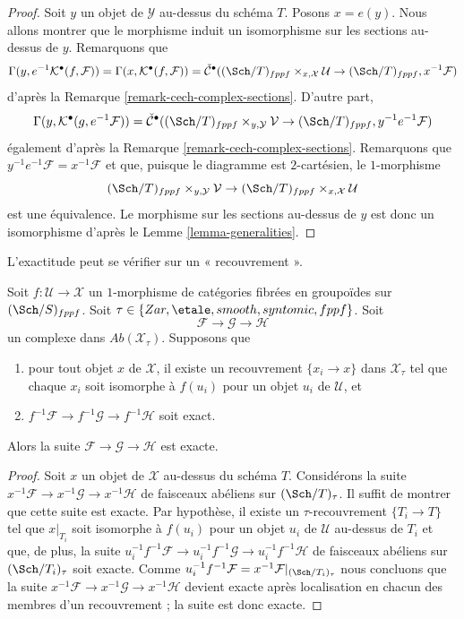 \begin{proof}
Soit $y$ un objet de $\mathcal{Y}$ au-dessus du schéma $T$.
Posons $x = e(y)$. Nous allons montrer que le morphisme induit un isomorphisme
sur les sections au-dessus de $y$. Remarquons que
$$
\Gamma(y, e^{-1}\mathcal{K}^\bullet(f, \mathcal{F})) =
\Gamma(x, \mathcal{K}^\bullet(f, \mathcal{F})) =
\check{\mathcal{C}}^\bullet(
(\Sch/T)_{fppf} \times_{x, \mathcal{X}} \mathcal{U} \to
(\Sch/T)_{fppf}, x^{-1}\mathcal{F})
$$
d'après la
Remarque \ref{remark-cech-complex-sections}. D'autre part,
$$
\Gamma(y, \mathcal{K}^\bullet(g, e^{-1}\mathcal{F})) =
\check{\mathcal{C}}^\bullet(
(\Sch/T)_{fppf} \times_{y, \mathcal{Y}} \mathcal{V} \to
(\Sch/T)_{fppf}, y^{-1}e^{-1}\mathcal{F})
$$
également d'après la
Remarque \ref{remark-cech-complex-sections}.
Remarquons que $y^{-1}e^{-1}\mathcal{F} = x^{-1}\mathcal{F}$
et que, puisque le diagramme est $2$-cartésien, le $1$-morphisme
$$
(\Sch/T)_{fppf} \times_{y, \mathcal{Y}} \mathcal{V} \to
(\Sch/T)_{fppf} \times_{x, \mathcal{X}} \mathcal{U}
$$
est une équivalence. Le morphisme sur les sections au-dessus de $y$ est donc un
isomorphisme d'après le
Lemme \ref{lemma-generalities}.
\end{proof}

\noindent
L'exactitude peut se vérifier sur un « recouvrement ».

\begin{lemma}
\label{lemma-check-exactness-covering}
Soit $f : \mathcal{U} \to \mathcal{X}$ un $1$-morphisme de catégories fibrées
en groupoïdes sur $(\Sch/S)_{fppf}$. Soit
$\tau \in \{Zar, \etale, smooth, syntomic, fppf\}$.
Soit
$$
\mathcal{F} \to \mathcal{G} \to \mathcal{H}
$$
un complexe dans $\textit{Ab}(\mathcal{X}_\tau)$. Supposons que
\begin{enumerate}
\item pour tout objet $x$ de $\mathcal{X}$, il existe un recouvrement
$\{x_i \to x\}$ dans $\mathcal{X}_\tau$ tel que chaque $x_i$ soit isomorphe
à $f(u_i)$ pour un objet $u_i$ de $\mathcal{U}$, et
\item $f^{-1}\mathcal{F} \to f^{-1}\mathcal{G} \to f^{-1}\mathcal{H}$ soit exact.
\end{enumerate}
Alors la suite $\mathcal{F} \to \mathcal{G} \to \mathcal{H}$
est exacte.
\end{lemma}

\begin{proof}
Soit $x$ un objet de $\mathcal{X}$ au-dessus du schéma $T$.
Considérons la suite
$x^{-1}\mathcal{F} \to x^{-1}\mathcal{G} \to x^{-1}\mathcal{H}$
de faisceaux abéliens sur $(\Sch/T)_\tau$. Il suffit de montrer
que cette suite est exacte. Par hypothèse, il existe un $\tau$-recouvrement
$\{T_i \to T\}$ tel que $x|_{T_i}$ soit isomorphe à $f(u_i)$ pour
un objet $u_i$ de $\mathcal{U}$ au-dessus de $T_i$ et que, de plus, la suite
$u_i^{-1}f^{-1}\mathcal{F} \to u_i^{-1}f^{-1}\mathcal{G} \to
u_i^{-1}f^{-1}\mathcal{H}$ de faisceaux abéliens sur $(\Sch/T_i)_\tau$
soit exacte. Comme
$u_i^{-1}f^{-1}\mathcal{F} = x^{-1}\mathcal{F}|_{(\Sch/T_i)_\tau}$
nous concluons que la suite
$x^{-1}\mathcal{F} \to x^{-1}\mathcal{G} \to x^{-1}\mathcal{H}$
devient exacte après localisation en chacun des membres d'un recouvrement ;
la suite est donc exacte.
\end{proof}

